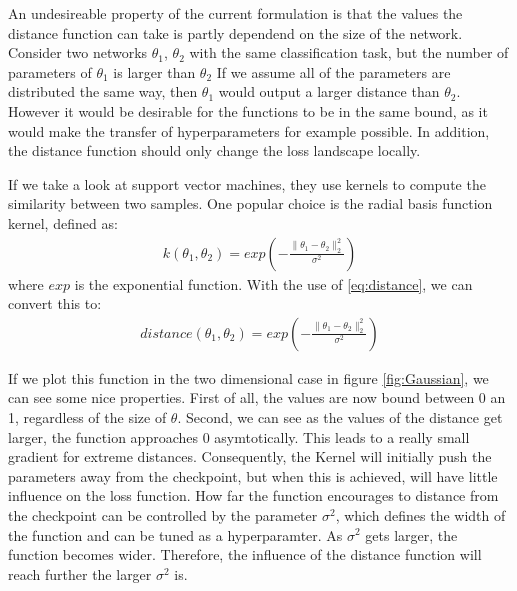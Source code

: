 An undesireable property of the current formulation is that the values the
distance function can take is partly dependend on the size of the network.
Consider two networks $\theta_1$, $\theta_2$ with the same classification task,
but the number of parameters of $\theta_1$ is larger than $\theta_2$ If we
assume all of the parameters are distributed the same way, then $\theta_1$ would
output a larger distance than $\theta_2$. However it would be desirable for the
functions to be in the same bound, as it would make the transfer of
hyperparameters for example possible. In addition, the distance function should
only change the loss landscape locally.

If we take a look at support vector machines, they use kernels to compute the
similarity between two samples. One popular choice is the radial basis function
kernel, defined as:
\begin{align}\label{eq:RBF}
    k(\theta_1, \theta_2)=exp(-\frac{\rVert \theta_1 - \theta_2 \lVert_2^2}{\sigma^2})
\end{align}
where $exp$ is the exponential function. With the use of \ref{eq:distance}, we
can convert this to:
\begin{align}\label{eq:DistanceFinal}
    distance(\theta_1, \theta_2)=exp(-\frac{\rVert \theta_1 - \theta_2 \lVert_2^2}{\sigma^2})
\end{align}

If we plot this function in the two dimensional case in figure
\ref{fig:Gaussian}, we can see some nice properties. First of all, the values
are now bound between 0 an 1, regardless of the size of $\theta$. Second, we can
see as the values of the distance get larger, the function approaches 0
asymtotically. This leads to a really small gradient for extreme distances.
Consequently, the Kernel will initially push the parameters away from the
checkpoint, but when this is achieved, will have little influence on the loss
function. How far the function encourages to distance from the checkpoint can be
controlled by the parameter $\sigma^2$, which defines the width of the function
and can be tuned as a hyperparamter. As $\sigma^2$ gets larger, the function
becomes wider. Therefore, the influence of the distance function will reach
further the larger $\sigma^2$ is.

